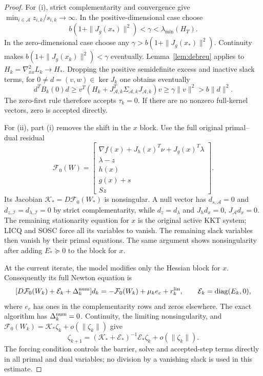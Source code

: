 \documentclass[pdflatex,sn-mathphys-num]{sn-jnl}
\theoremstyle{thmstyleone}
\theoremstyle{thmstylethree}
\newcounter{algorithm}
\begin{document}
\begin{proof}
For (i), strict complementarity and convergence give
$\min_{i\in\mathcal A}z_{i,k}/s_{i,k}\to\infty$.
In the positive-dimensional case choose
\[
 b(1+\|J_g(x_*)\|^2)<\gamma<\lambda_{\min}(H_T).
\]
In the zero-dimensional case choose any
$\gamma>b(1+\|J_g(x_*)\|^2)$.
Continuity makes $b(1+\|J_g(x_k)\|^2)<\gamma$ eventually.
Lemma~\ref{lem:debreu} applies to
$H_k=\nabla^2_{xx}L_k\to H_*$.
Dropping the positive semidefinite excess and inactive slack terms,
for $0\ne d=(v,w)\in\ker J_k$ one obtains eventually
\[
 d^TB_k(0)d\geq
 v^T(H_k+J_{\mathcal A,k}^T\Sigma_{\mathcal A,k}
                                      J_{\mathcal A,k})v
 \geq\gamma\|v\|^2>b\|d\|^2.
\]
The zero-first rule therefore accepts $\tau_k=0$.
If there are no nonzero full-kernel vectors, zero is accepted directly.

For (ii), part (i) removes the shift in the $x$ block. Use the full original
primal--dual residual
\[
 \mathcal F_0(W)=
 \begin{bmatrix}
 \nabla f(x)+J_h(x)^T\nu+J_g(x)^T\lambda\\
 \lambda-z\\ h(x)\\g(x)+s\\Sz
 \end{bmatrix}.
\]
Its Jacobian $\mathcal K_*=D\mathcal F_0(W_*)$ is nonsingular.
A null vector has $d_{s,\mathcal A}=0$ and
$d_{z,\mathcal I}=d_{\lambda,\mathcal I}=0$ by strict
complementarity, while $d_z=d_\lambda$ and
$J_hd_x=0$, $J_{\mathcal A}d_x=0$.
The remaining stationarity equation for $x$ is the original active
KKT system; LICQ and SOSC force all its variables to vanish.
The remaining slack variables then vanish by their primal equations.
The same argument shows nonsingularity after adding $E_*\succeq0$ to
the block for $x$.

At the current iterate, the model modifies only the Hessian block for $x$.
Consequently its full Newton equation is
\[
 [D\mathcal F_0(W_k)+\mathcal E_k+\Delta_k^{\rm num}]d_k
   =-\mathcal F_0(W_k)+\mu_k e_c+r_k^{\rm lin},
 \qquad \mathcal E_k=\operatorname{diag}(E_k,0),
\]
where $e_c$ has ones in the complementarity rows and zeros elsewhere.
The exact algorithm has $\Delta_k^{\rm num}=0$.
Continuity, the limiting nonsingularity, and
$\mathcal F_0(W_k)=\mathcal K_*\zeta_k+o(\|\zeta_k\|)$ give
\[
 \zeta_{k+1}=
 (\mathcal K_*+\mathcal E_*)^{-1}\mathcal E_*\zeta_k
       +o(\|\zeta_k\|).
\]
The forcing condition controls the barrier, solve and accepted-step
terms directly in all primal and dual variables; no division by a vanishing slack is
used in this estimate.


\end{proof}
\end{document}
